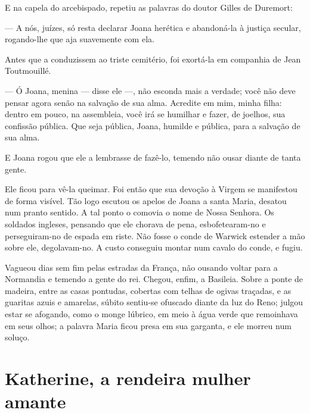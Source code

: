 E na capela do arcebispado, repetiu as palavras do doutor Gilles de
Duremort:

--- A nós, juízes, só resta declarar Joana herética e abandoná-la à justiça
secular, rogando-lhe que aja suavemente com ela.

Antes que a conduzissem ao triste cemitério, foi exortá-la em companhia de
Jean Toutmouillé.

--- Ó Joana, menina --- disse ele ---, não esconda mais a verdade; você não deve
pensar agora senão na salvação de sua alma. Acredite em mim, minha filha:
dentro em pouco, na assembleia, você irá se humilhar e fazer, de joelhos,
sua confissão pública. Que seja pública, Joana, humilde e pública, para a
salvação de sua alma.

E Joana rogou que ele a lembrasse de fazê-lo, temendo não ousar diante de
tanta gente.

Ele ficou para vê-la queimar. Foi então que sua devoção à Virgem se
manifestou de forma visível. Tão logo escutou os apelos de Joana a santa
Maria, desatou num pranto sentido. A tal ponto o comovia o nome de Nossa
Senhora. Os soldados ingleses, pensando que ele chorava de pena,
esbofetearam-no e perseguiram-no de espada em riste. Não fosse o conde de
Warwick estender a mão sobre ele, degolavam-no. A custo conseguiu montar
num cavalo do conde, e fugiu.

Vagueou dias sem fim pelas estradas da França, não ousando voltar para a
Normandia e temendo a gente do rei. Chegou, enfim, a Basileia. Sobre a
ponte de madeira, entre as casas pontudas, cobertas com telhas de ogivas
traçadas, e as guaritas azuis e amarelas, súbito sentiu-se ofuscado diante
da luz do Reno; julgou estar se afogando, como o monge lúbrico, em meio à
água verde que remoinhava em seus olhos; a palavra Maria ficou presa em
sua garganta, e ele morreu num soluço.

\chapter{Katherine, a rendeira mulher amante}


